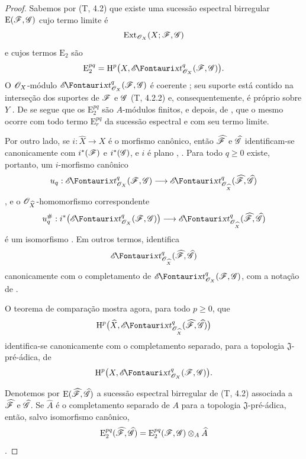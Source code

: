 \begin{proof}
Sabemos por (T, 4.2) que existe uma sucessão espectral birregular
$\mathrm{E}(\mathscr{F},\mathscr{G})$ cujo termo limite é
\[
  \operatorname{Ext}_{\mathscr{O}_X}(X;\mathscr{F},\mathscr{G})
\]
e cujos termos $\mathrm{E}_2$ são
\[
  \mathrm{E}_2^{pq}
  =\HH^p\bigl(X,\shExt^q_{\sh{O}_X}(\sh{F},\sh{G})\bigr).
\]
O $\mathscr{O}_X$-módulo
$\shExt^q_{\sh{O}_X}(\sh{F},\sh{G})$ é coerente
; seu suporte está contido na interseção dos
suportes de $\mathscr{F}$ e $\mathscr{G}$ (T, 4.2.2) e, consequentemente, é
próprio sobre $Y$ . De  se segue
que os $\mathrm{E}_2^{pq}$ são $A$-módulos finitos, e depois, de
, que o mesmo ocorre com todo termo
$\mathrm{E}_r^{pq}$ da sucessão espectral e com seu termo limite.

Por outro lado, se $i:\hat{X}\to X$ é o morfismo canônico, então
$\widehat{\mathscr{F}}$ e $\widehat{\mathscr{G}}$ identificam-se canonicamente com
$i^*(\mathscr{F})$ e $i^*(\mathscr{G})$, e $i$ é plano
, . Para todo $q\geq0$ existe,
portanto, um $i$-morfismo canônico
\[
  u_q:\shExt^q_{\sh{O}_X}(\sh{F},\sh{G})
  \longrightarrow
  \shExt^q_{\sh{O}_{\hat{X}}}
    (\hat{\sh{F}},\hat{\sh{G}})
\]
, e o $\mathscr{O}_{\widehat{X}}$-homomorfismo
correspondente
\[
  u_q^\#:
  i^*\bigl(\shExt^q_{\sh{O}_X}(\sh{F},\sh{G})\bigr)
  \longrightarrow
  \shExt^q_{\sh{O}_{\hat{X}}}
    (\hat{\sh{F}},\hat{\sh{G}})
\]
é um isomorfismo . Em outros termos,
 identifica
\[
  \shExt^q_{\sh{O}_{\hat{X}}}
    (\hat{\sh{F}},\hat{\sh{G}})
\]
canonicamente com o completamento de
$\shExt^q_{\sh{O}_X}(\sh{F},\sh{G})$, com a notação de
.

O teorema de comparação  mostra agora, para todo
$p\geq0$, que
\[
  \HH^p\bigl(\hat{X},
    \shExt^q_{\sh{O}_{\hat{X}}}
      (\hat{\sh{F}},\hat{\sh{G}})\bigr)
\]
identifica-se canonicamente com o completamento separado, para a
topologia $\mathfrak J$-pré-ádica, de
\[
  \HH^p\bigl(X,\shExt^q_{\sh{O}_X}(\sh{F},\sh{G})\bigr).
\]


Denotemos por $\mathrm{E}(\widehat{\mathscr{F}},\widehat{\mathscr{G}})$ a sucessão
espectral birregular de (T, 4.2) associada a $\widehat{\mathscr{F}}$ e
$\widehat{\mathscr{G}}$. Se $\hat{A}$ é o completamento separado de $A$ para
a topologia $\mathfrak J$-pré-ádica, então, salvo isomorfismo
canônico,
\[
  \mathrm{E}_2^{pq}(\widehat{\mathscr{F}},\widehat{\mathscr{G}})
  =
  \mathrm{E}_2^{pq}(\mathscr{F},\mathscr{G})\otimes_A\widehat{A}
\]
.


\end{proof}
